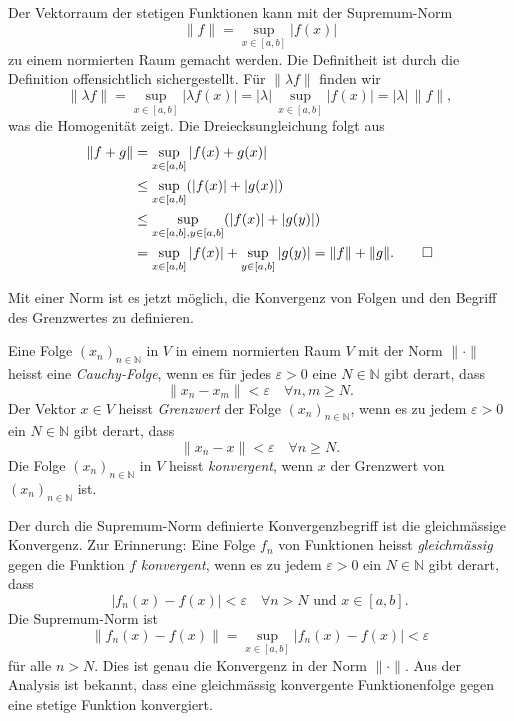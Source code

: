 \begin{beispiel}
Der Vektorraum der stetigen Funktionen kann mit der Supremum-Norm
\[
\|f\| = \sup_{x\in[a,b]} |f(x)|
\]
zu einem normierten Raum gemacht werden.
Die Definitheit ist durch die Definition offensichtlich sichergestellt.
Für $\|\lambda f\|$ finden wir
\[
\|\lambda f\|
=
\sup_{x\in[a,b]} |\lambda f(x)|
=
|\lambda|\,
\sup_{x\in[a,b]} |f(x)|
=
|\lambda|\, \|f\|,
\]
was die Homogenität zeigt.
Die Dreiecksungleichung folgt aus
\begin{align*}
\|f+g\|
&=
\sup_{x\in[a,b]} |f(x)+g(x)|
\\
&\le
\sup_{x\in[a,b]} (|f(x)|+|g(x)|)
\\
&\le
\sup_{x\in[a,b], y\in[a,b]} (|f(x)|+|g(y)|)
\\
&=
\sup_{x\in[a,b]} |f(x)|
+
\sup_{y\in[a,b]} |g(y)|
=
\|f\| + \|g\|.
\qedhere
\end{align*}
\end{beispiel}

Mit einer Norm ist es jetzt möglich, die Konvergenz von Folgen und den
Begriff des Grenzwertes zu definieren.

\begin{definition}
Eine Folge $(x_n)_{n\in\mathbb{N}}$ in $V$ in einem normierten Raum $V$
mit der Norm $\|\cdot\|$
heisst eine {\em Cauchy-Folge}, wenn es für jedes $\varepsilon>0$ eine
%
$N\in \mathbb{N}$ gibt derart, dass
\[
\| x_n - x_m \| < \varepsilon
\quad\forall n,m\ge N.
\]
Der Vektor $x\in V$ heisst {\em Grenzwert} der Folge $(x_n)_{n\in\mathbb{N}}$,
%
wenn es zu jedem $\varepsilon > 0$ ein $N\in\mathbb{N}$ gibt derart, dass
\[
\|x_n-x\| < \varepsilon 
\quad\forall n\ge N.
\]
Die Folge $(x_n)_{n\in\mathbb{N}}$  in $V$ heisst {\em konvergent}, wenn
%
$x$ der Grenzwert von $(x_n)_{n\in\mathbb{N}}$ ist.
\end{definition}

Der durch die Supremum-Norm definierte Konvergenzbegriff ist die gleichmässige
Konvergenz.
Zur Erinnerung:
Eine Folge $f_n$ von Funktionen heisst {\em gleichmässig}
gegen die
%
Funktion $f$ {\em konvergent}, wenn es zu jedem
$\varepsilon >0$ ein $N\in\mathbb{N}$ gibt derart, dass
\[
|f_n(x) - f(x)|<\varepsilon\quad\forall n>N\text{ und }x\in [a,b].
\]
Die Supremum-Norm ist
\[
\|f_n(x) - f(x)\|
=
\sup_{x\in[a,b]} |f_n(x)-f(x)| < \varepsilon
\]
für alle $n>N$.
Dies ist genau die Konvergenz in der Norm $\|\cdot\|$.
Aus der Analysis ist bekannt, dass eine gleichmässig konvergente 
Funktionenfolge gegen eine stetige Funktion konvergiert.

